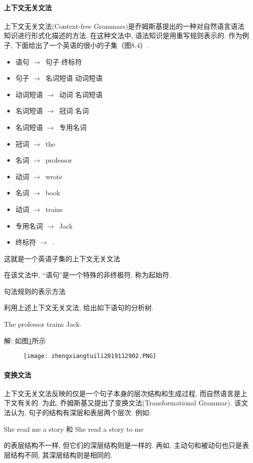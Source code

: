 \paragraph{上下文无关文法}
上下文无关文法(Context-free  Grammars)是乔姆斯基提出的一种对自然语言语法知识进行形式化描述的方法. 在这种文法中, 语法知识是用重写规则表示的. 作为例子, 下面给出了一个英语的很小的子集（图8.4）.

\begin{itemize}
\item 语句 $\rightarrow$\,  句子   终标符
\item 句子 $\rightarrow$\,  名词短语   动词短语
\item 动词短语 $\rightarrow$\,  动词   名词短语
\item 名词短语 $\rightarrow$\,  冠词   名词
\item 名词短语 $\rightarrow$\,  专用名词
\item 冠词 $\rightarrow$\,  the
\item 名词 $\rightarrow$\,  professor
\item 动词 $\rightarrow$\,  wrote
\item 名词 $\rightarrow$\,  book
\item 动词 $\rightarrow$\,  trains
\item 专用名词 $\rightarrow$\,  Jack
\item 终标符 $\rightarrow$\, .
\end{itemize}
这就是一个英语子集的上下文无关文法

在该文法中, “语句”是一个特殊的非终极符, 称为起始符.

句法规则的表示方法

\begin{example}
利用上述上下文无关文法, 给出如下语句的分析树.

The  professor  trains  Jack.
\end{example}

解: 如图\ref{AI32fig2902}所示
\begin{figure}[H]
\centering
\texttt{[image: zhengxiangtuili2019112902.PNG]}
\caption{}
\label{AI32fig2902}
\end{figure}
\paragraph{变换文法}
上下文无关文法反映的仅是一个句子本身的层次结构和生成过程, 而自然语言是上下文有关的. 为此, 乔姆斯基又提出了变换文法(Transformational  Grammar). 该文法认为, 句子的结构有深层和表层两个层次. 例如:
\begin{center}
  She  read  me  a  story  和  She  read  a  story  to  me
\end{center}
的表层结构不一样, 但它们的深层结构则是一样的. 再如, 主动句和被动句也只是表层结构不同, 其深层结构则是相同的.

